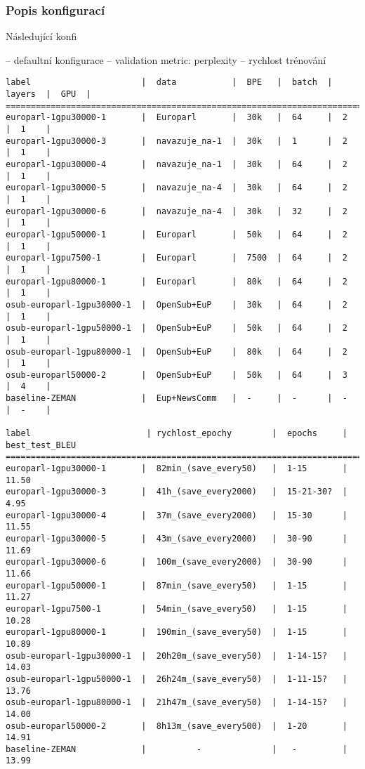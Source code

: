 \documentclass[a4]{article}
\begin{document}
\subsubsection{Popis konfigurací}

Následující konfi

-- defaultní konfigurace
	-- validation metric: perplexity
-- rychlost trénování



\begin{verbatim}
label                      |  data           |  BPE   |  batch  |  layers  |  GPU  |  
====================================================================================
europarl-1gpu30000-1       |  Europarl       |  30k   |  64     |  2       |  1    |  
europarl-1gpu30000-3       |  navazuje_na-1  |  30k   |  1      |  2       |  1    |  
europarl-1gpu30000-4       |  navazuje_na-1  |  30k   |  64     |  2       |  1    |  
europarl-1gpu30000-5       |  navazuje_na-4  |  30k   |  64     |  2       |  1    |  
europarl-1gpu30000-6       |  navazuje_na-4  |  30k   |  32     |  2       |  1    |  
europarl-1gpu50000-1       |  Europarl       |  50k   |  64     |  2       |  1    |  
europarl-1gpu7500-1        |  Europarl       |  7500  |  64     |  2       |  1    |  
europarl-1gpu80000-1       |  Europarl       |  80k   |  64     |  2       |  1    |  
osub-europarl-1gpu30000-1  |  OpenSub+EuP    |  30k   |  64     |  2       |  1    |  
osub-europarl-1gpu50000-1  |  OpenSub+EuP    |  50k   |  64     |  2       |  1    |  
osub-europarl-1gpu80000-1  |  OpenSub+EuP    |  80k   |  64     |  2       |  1    |  
osub-europarl50000-2       |  OpenSub+EuP    |  50k   |  64     |  3       |  4    |  
baseline-ZEMAN             |  Eup+NewsComm   |  -     |  -      |  -       |  -    |
 
label                       | rychlost_epochy        |  epochs     |  best_test_BLEU
====================================================================================
europarl-1gpu30000-1       |  82min_(save_every50)   |  1-15       |  11.50
europarl-1gpu30000-3       |  41h_(save_every2000)   |  15-21-30?  |  4.95
europarl-1gpu30000-4       |  37m_(save_every2000)   |  15-30      |  11.55
europarl-1gpu30000-5       |  43m_(save_every2000)   |  30-90      |  11.69
europarl-1gpu30000-6       |  100m_(save_every2000)  |  30-90      |  11.66
europarl-1gpu50000-1       |  87min_(save_every50)   |  1-15       |  11.27
europarl-1gpu7500-1        |  54min_(save_every50)   |  1-15       |  10.28
europarl-1gpu80000-1       |  190min_(save_every50)  |  1-15       |  10.89
osub-europarl-1gpu30000-1  |  20h20m_(save_every50)  |  1-14-15?   |  14.03
osub-europarl-1gpu50000-1  |  26h24m_(save_every50)  |  1-11-15?   |  13.76
osub-europarl-1gpu80000-1  |  21h47m_(save_every50)  |  1-14-15?   |  14.00
osub-europarl50000-2       |  8h13m_(save_every500)  |  1-20       |  14.91
baseline-ZEMAN             |          -              |   -         |  13.99
\end{verbatim}
\end{document}
